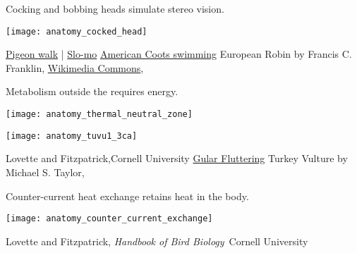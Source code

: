 \documentclass[t]{beamer}
\begin{document}
\begin{frame}[t,plain]{Cocking and bobbing heads simulate stereo vision.}

	\vspace{-0.5\baselineskip}
	
	\centering
	\texttt{[image: anatomy\_cocked\_head]}
		
	\vfilll
	
	\tiny \href{https://www.youtube.com/watch?v=bG139rclp_E}{Pigeon walk} |  \href{https://www.youtube.com/watch?v=9WV5DfDeCZI}{Slo-mo} \hfill \href{https://www.youtube.com/watch?v=BsNjIuDpJjM&t=30s}{American Coots swimming} \hfill European Robin by Francis C. Franklin, \href{https://en.wikipedia.org/wiki/File:Erithacus_rubecula_with_cocked_head.jpg}{Wikimedia Commons}, 
\end{frame}



\begin{frame}[t,plain]{Metabolism outside the  requires energy.}

	\vspace{-\baselineskip}
	
	\begin{multicols}{2}
	
	\centering
	\texttt{[image: anatomy\_thermal\_neutral\_zone]} 
	
	\columnbreak
	
	\texttt{[image: anatomy\_tuvu1\_3ca]}
	
	\end{multicols}

	\vfilll
	
	\tiny Lovette and Fitzpatrick,Cornell University \hfill \href{https://www.youtube.com/watch?v=NggVoJ7mOos}{Gular Fluttering} \hfill Turkey Vulture by Michael S. Taylor, 

\end{frame}

\begin{frame}[t,plain]{Counter-current heat exchange retains heat in the body.}
	
	\centering
	\texttt{[image: anatomy\_counter\_current\_exchange]} 

	\vfilll
	
	\tiny \hfill Lovette and Fitzpatrick, \textit{Handbook of Bird Biology} \textcopyright\,Cornell University

\end{frame}
\end{document}
